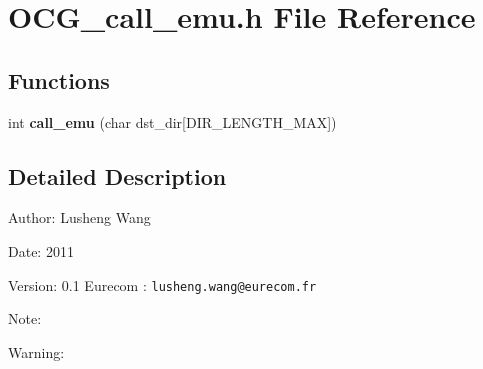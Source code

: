 \section{OCG\_\-call\_\-emu.h File Reference}
\label{OCG__call__emu_8h}
\subsection*{Functions}
\begin{CompactItemize}
\item 
int {\bf call\_\-emu} (char dst\_\-dir[DIR\_\-LENGTH\_\-MAX])
\end{CompactItemize}


\subsection{Detailed Description}
\begin{Desc}
\item[Author:]Lusheng Wang \end{Desc}
\begin{Desc}
\item[Date:]2011 \end{Desc}
\begin{Desc}
\item[Version:]0.1  Eurecom : {\tt lusheng.wang@eurecom.fr} \end{Desc}
\begin{Desc}
\item[Note:]\end{Desc}
\begin{Desc}
\item[Warning:]\end{Desc}
